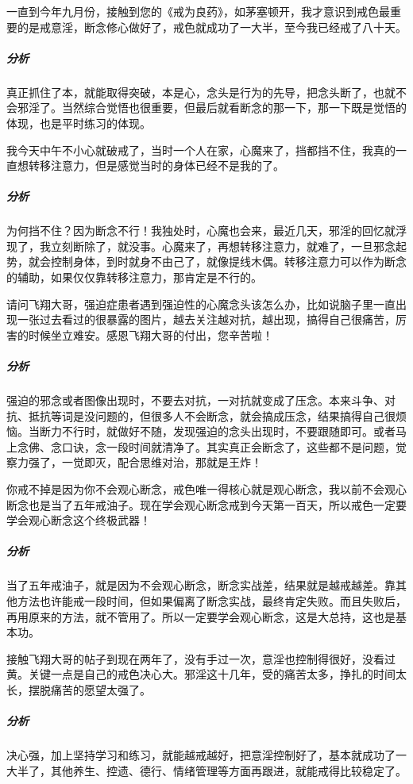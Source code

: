 \begin{case}
    一直到今年九月份，接触到您的《戒为良药》，如茅塞顿开，我才意识到戒色最重要的是戒意淫，断念修心做好了，戒色就成功了一大半，至今我已经戒了八十天。
    \subparagraph{分析} 真正抓住了本，就能取得突破，本是心，念头是行为的先导，把念头断了，也就不会邪淫了。当然综合觉悟也很重要，但最后就看断念的那一下，那一下既是觉悟的体现，也是平时练习的体现。
\end{case}

\begin{case}
    我今天中午不小心就破戒了，当时一个人在家，心魔来了，挡都挡不住，我真的一直想转移注意力，但是感觉当时的身体已经不是我的了。
    \subparagraph{分析} 为何挡不住？因为断念不行！我独处时，心魔也会来，最近几天，邪淫的回忆就浮现了，我立刻断除了，就没事。心魔来了，再想转移注意力，就难了，一旦邪念起势，就会控制身体，到时就身不由己了，就像提线木偶。转移注意力可以作为断念的辅助，如果仅仅靠转移注意力，那肯定是不行的。
\end{case}

\begin{case}
    请问飞翔大哥，强迫症患者遇到强迫性的心魔念头该怎么办，比如说脑子里一直出现一张过去看过的很暴露的图片，越去关注越对抗，越出现，搞得自己很痛苦，厉害的时候坐立难安。感恩飞翔大哥的付出，您辛苦啦！
    \subparagraph{分析} 强迫的邪念或者图像出现时，不要去对抗，一对抗就变成了压念。本来斗争、对抗、抵抗等词是没问题的，但很多人不会断念，就会搞成压念，结果搞得自己很烦恼。当断力不行时，就做好不随，发现强迫的念头出现时，不要跟随即可。或者马上念佛、念口诀，念一段时间就清净了。其实真正会断念了，这些都不是问题，觉察力强了，一觉即灭，配合思维对治，那就是王炸！
\end{case}

\begin{case}
    你戒不掉是因为你不会观心断念，戒色唯一得核心就是观心断念，我以前不会观心断念也是当了五年戒油子。现在学会观心断念戒到今天第一百天，所以戒色一定要学会观心断念这个终极武器！
    \subparagraph{分析} 当了五年戒油子，就是因为不会观心断念，断念实战差，结果就是越戒越差。靠其他方法也许能戒一段时间，但如果偏离了断念实战，最终肯定失败。而且失败后，再用原来的方法，就不管用了。所以一定要学会观心断念，这是大总持，这也是基本功。
\end{case}

\begin{case}
    接触飞翔大哥的帖子到现在两年了，没有手过一次，意淫也控制得很好，没看过黄。关键一点是自己的戒色决心大。邪淫这十几年，受的痛苦太多，挣扎的时间太长，摆脱痛苦的愿望太强了。
    \subparagraph{分析} 决心强，加上坚持学习和练习，就能越戒越好，把意淫控制好了，基本就成功了一大半了，其他养生、控遗、德行、情绪管理等方面再跟进，就能戒得比较稳定了。
\end{case}

